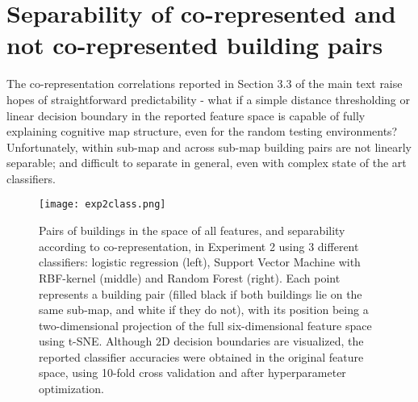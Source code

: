 \section{Separability of co-represented and not co-represented building pairs}

The co-representation correlations reported in Section 3.3 of the main text raise hopes of straightforward predictability - what if a simple distance thresholding or linear decision boundary in the reported feature space is capable of fully explaining cognitive map structure, even for the random testing environments? Unfortunately, within sub-map and across sub-map building pairs are not linearly separable; and difficult to separate in general, even with complex state of the art classifiers. 


\begin{figure}[h]
	\centering
	\texttt{[image: exp2class.png]}
	\caption[Pairs of buildings in the space of all features, and separability, in Experiment 2]{Pairs of buildings in the space of all features, and separability according to co-representation, in Experiment 2 using 3 different classifiers: logistic regression (left), Support Vector Machine with RBF-kernel (middle) and Random Forest (right). Each point represents a building pair (filled black if both buildings lie on the same sub-map, and white if they do not), with its position being a two-dimensional projection of the full six-dimensional feature space using t-SNE.  Although 2D decision boundaries are visualized, the reported classifier accuracies were obtained in the original feature space, using 10-fold cross validation and after hyperparameter optimization.}
	\label{fig_classify}
\end{figure}

